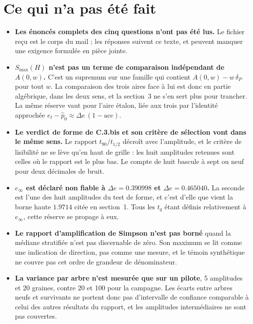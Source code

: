 \documentclass[11pt,a4paper]{article}
\begin{document}
\section{Ce qui n'a pas été fait}
\label{sec:nonfait}

\begin{itemize}
  \item \textbf{Les énoncés complets des cinq questions n'ont pas été lus.} Le fichier reçu
  est le corps du mail ; les réponses suivent ce texte, et peuvent manquer une exigence
  formulée en pièce jointe.

  \item \textbf{$S_{\max}(H)$ n'est pas un terme de comparaison indépendant de $A(0,w)$.}
  C'est un supremum sur une famille qui contient $A(0,w) - w\,\delta_P$ pour tout $w$. La
  comparaison des trois aires face à lui est donc en partie algébrique, dans les deux sens,
  et la section~3 ne s'en sert plus pour trancher. La même réserve vaut pour l'aire étalon,
  liée aux trois par l'identité approchée $e_t - \hat{p}_0 \approx \Delta e\,(1 - \mathrm{acc})$.

  \item \textbf{Le verdict de forme de C.3.bis et son critère de sélection vont dans le même
  sens.} Le rapport $t_{90}/t_{1/2}$ décroît avec l'amplitude, et le critère de lisibilité ne
  se lève qu'en haut de grille : les huit amplitudes retenues sont celles où le rapport est le
  plus bas. Le compte de huit bascule à sept ou neuf pour deux décimales de bruit.

  \item \textbf{$e_\infty$ est déclaré non fiable à $\Delta e = 0.390998$ et
  $\Delta e = 0.465040$.} La seconde est l'une des huit amplitudes du test de forme, et c'est
  d'elle que vient la borne haute $1.9714$ citée en section~1. Tous les $t_q$ étant définis
  relativement à $e_\infty$, cette réserve se propage à eux.

  \item \textbf{Le rapport d'amplification de Simpson n'est pas borné} quand la médiane
  stratifiée n'est pas discernable de zéro. Son maximum se lit comme une indication de
  direction, pas comme une mesure, et le témoin synthétique ne couvre pas cet ordre de
  grandeur de dénominateur.

  \item \textbf{La variance par arbre n'est mesurée que sur un pilote}, 5 amplitudes et 20
  graines, contre 20 et 100 pour la campagne. Les écarts entre arbres neufs et survivants ne
  portent donc pas d'intervalle de confiance comparable à celui des autres résultats du
  rapport, et les amplitudes intermédiaires ne sont pas couvertes.


\end{itemize}
\end{document}
